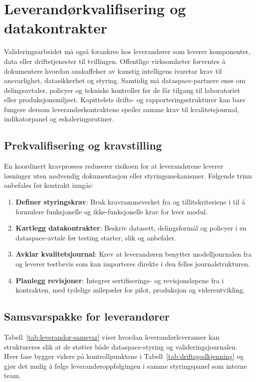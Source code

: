 \section{Leverand\o{}rkvalifisering og datakontrakter}
Valideringsarbeidet må også forankres hos leverandører som leverer komponenter, data eller driftstjenester til tvillingen. Offentlige virksomheter forventes å dokumentere hvordan anskaffelser av kunstig intelligens ivaretar krav til ansvarlighet, datasikkerhet og styring.\citep{dfo2024anskaffelseki} Samtidig må dataspace-partnere enes om delingsavtaler, policyer og tekniske kontroller før de får tilgang til laboratoriet eller produksjonsmiljøet.\citep{digdir2024datasamarbeid,idsa2023operational} Kapittelets drifts- og rapporteringsstrukturer kan bare fungere dersom leverandørkontraktene speiler samme krav til kvalitetsjournal, indikatorpanel og eskaleringsrutiner.

\subsection{Prekvalifisering og kravstilling}
En koordinert kravprosess reduserer risikoen for at leverandørene leverer løsninger uten nødvendig dokumentasjon eller styringsmekanismer. Følgende trinn anbefales før kontrakt inngås:
\begin{enumerate}
    \item \textbf{Definer styringskrav}: Bruk kravrammeverket fra \citet{dfo2024anskaffelseki} og tillitskriteriene i \citet{iso2020tr24028} til å formulere funksjonelle og ikke-funksjonelle krav for hver modul.
    \item \textbf{Kartlegg datakontrakter}: Beskriv datasett, delingsformål og policyer i en dataspace-avtale før testing starter, slik \citet{digdir2024datasamarbeid} og \citet{idsa2023operational} anbefaler.
    \item \textbf{Avklar kvalitetsjournal}: Krev at leverandøren benytter modelljournalen fra \citet{digdir2023modelljournal} og leverer testbevis som kan importeres direkte i den felles journalstrukturen.
    \item \textbf{Planlegg revisjoner}: Integrer sertifiserings- og revisjonsløpene fra \citet{dnv2023digitalassurance} i kontrakten, med tydelige milepæler for pilot, produksjon og videreutvikling.
\end{enumerate}

\subsection{Samsvarspakke for leverand\o{}rer}
Tabell~\ref{tab:leverandor-samsvar} viser hvordan leverandørleveranser kan struktureres slik at de støtter både dataspace-styring og valideringsjournalen. Hver fase bygger videre på kontrollpunktene i Tabell~\ref{tab:driftsgodkjenning} og gjør det mulig å følge leverandøroppfølgingen i samme styringspanel som interne team.

